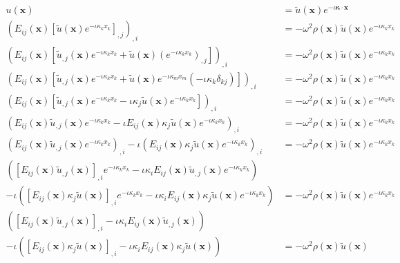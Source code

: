\documentclass{article}
\newcommand{\imag}{\iota}
\newcommand{\vect}[1]{\boldsymbol{#1}}
\newcommand{\x}{x}
\newcommand{\vecx}{\vect{\x}}
\newcommand{\wavenum}{\kappa}
\newcommand{\wavevec}{\vect{\wavenum}}
\newcommand{\bloch}{e^{-\imag \wavevec \cdot \vecx}}
\newcommand{\blochcomp}[1]{e^{-\imag \wavenum_{#1} \x_{#1}}}
\newcommand{\kernel}[1]{\tilde{#1}}
\begin{document}
\begin{align}
    u(\vecx) &= \kernel{u}(\vecx) \bloch \\
    \left(
        E_{ij}(\vecx) \left[\kernel{u}(\vecx) \blochcomp{k}\right]_{,j}
    \right)_{,i} &=
    -\omega^2 \rho(\vecx) \kernel{u}(\vecx) \blochcomp{k}
    \nonumber \\
    \left(
        E_{ij}(\vecx) \left[
            \kernel{u}_{,j}(\vecx) \blochcomp{k}
            + \kernel{u}(\vecx) (\blochcomp{k})_{,j}
        \right]
    \right)_{,i} &=
    -\omega^2 \rho(\vecx) \kernel{u}(\vecx) \blochcomp{k}
    \nonumber \\
    \left(
        E_{ij}(\vecx) \left[
            \kernel{u}_{,j}(\vecx) \blochcomp{k}
            + \kernel{u}(\vecx) \blochcomp{m} (-\imag \wavenum_{k} \delta_{kj})
        \right]
    \right)_{,i} &=
    -\omega^2 \rho(\vecx) \kernel{u}(\vecx) \blochcomp{k}
    \nonumber \\
    \left(
        E_{ij}(\vecx) \left[
            \kernel{u}_{,j}(\vecx) \blochcomp{k}
            - \imag \wavenum_{j} \kernel{u}(\vecx) \blochcomp{k}
        \right]
    \right)_{,i} &=
    -\omega^2 \rho(\vecx) \kernel{u}(\vecx) \blochcomp{k}
    \nonumber \\
    \left(
        E_{ij}(\vecx) \kernel{u}_{,j}(\vecx) \blochcomp{k}
        - \imag E_{ij}(\vecx) \wavenum_{j} \kernel{u}(\vecx) \blochcomp{k}
    \right)_{,i} &=
    -\omega^2 \rho(\vecx) \kernel{u}(\vecx) \blochcomp{k}
    \nonumber \\
    \left(
        E_{ij}(\vecx) \kernel{u}_{,j}(\vecx) \blochcomp{k}
    \right)_{,i}
    - \imag \left(
        E_{ij}(\vecx) \wavenum_{j} \kernel{u}(\vecx) \blochcomp{k}
    \right)_{,i} &=
    -\omega^2 \rho(\vecx) \kernel{u}(\vecx) \blochcomp{k}
    \nonumber \\
    \left(
        \left[
            E_{ij}(\vecx) \kernel{u}_{,j}(\vecx)
        \right]_{,i} \blochcomp{k}
        -\imag \wavenum_{i} E_{ij}(\vecx) \kernel{u}_{,j}(\vecx) \blochcomp{k}
    \right)& \nonumber \\
    - \imag \left(
        \left[
            E_{ij}(\vecx) \kappa_{j} \kernel{u}(\vecx)
        \right]_{,i} \blochcomp{k}
        - \imag \wavenum_{i} E_{ij}(\vecx) \wavenum_{j} \kernel{u}(\vecx)
        \blochcomp{k}
    \right) &=
    -\omega^2 \rho(\vecx) \kernel{u}(\vecx) \blochcomp{k}
    \nonumber \\
    \left(
        \left[
            E_{ij}(\vecx) \kernel{u}_{,j}(\vecx)
        \right]_{,i}
        -\imag \wavenum_{i} E_{ij}(\vecx) \kernel{u}_{,j}(\vecx)
    \right)& \nonumber \\
    - \imag \left(
        \left[
            E_{ij}(\vecx) \kappa_{j} \kernel{u}(\vecx)
        \right]_{,i}
        - \imag \wavenum_{i} E_{ij}(\vecx) \wavenum_{j} \kernel{u}(\vecx)
    \right) &=
    -\omega^2 \rho(\vecx) \kernel{u}(\vecx)
\end{align}
\end{document}
